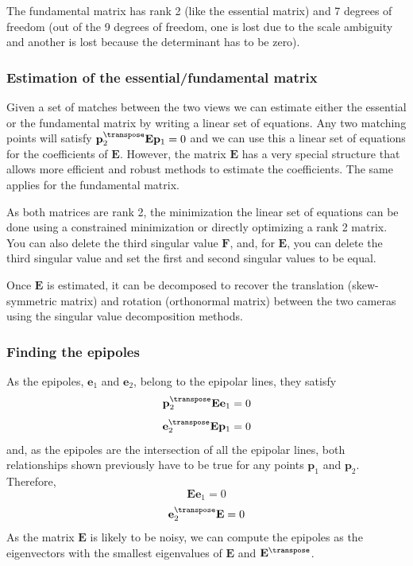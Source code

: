 The fundamental matrix has rank 2 (like the essential matrix) and 7 degrees of freedom (out of the 9 degrees of freedom, one is lost due to the scale ambiguity and another is lost because the determinant has to be zero). 

\subsubsection{Estimation of the essential/fundamental matrix}
Given a set of matches between the two views we can estimate either the essential or the fundamental matrix by writing a linear set of equations. Any two matching points will satisfy $\mathbf{p}_2^\transpose \mathbf{E} \mathbf{p}_1 = 0$ and we can use this a linear set of equations for the coefficients of $\mathbf{E}$. However, the matrix $\mathbf{E}$ has a very special structure that allows more efficient and robust methods to estimate the coefficients. The same applies for the fundamental matrix. 

As both matrices are rank 2, the minimization the linear set of equations can be done using a constrained minimization or directly optimizing a rank 2 matrix. You can also delete the third singular value $\mathbf{F}$, and, for $\mathbf{E}$, you can delete the third singular value and set the first and second singular values to be equal.

Once $\mathbf{E}$ is estimated, it can be decomposed to recover the translation (skew-symmetric matrix) and rotation (orthonormal matrix) between the two cameras using the singular value decomposition methods. 

\subsubsection{Finding the epipoles}
As the epipoles, $\mathbf{e}_1$ and $\mathbf{e}_2$, belong to the epipolar lines, they satisfy
\begin{equation}
\mathbf{p}_2^\transpose \mathbf{E} \mathbf{e}_1 = 0
\end{equation}\begin{equation}
\mathbf{e}_2^\transpose \mathbf{E} \mathbf{p}_1 = 0
\end{equation}
and, as the epipoles are the intersection of all the epipolar lines, both relationships shown previously have to be true for any points $\mathbf{p}_1$ and $\mathbf{p}_2$. Therefore, 
\begin{equation}
\mathbf{E} \mathbf{e}_1 = 0
\end{equation}\begin{equation}
\mathbf{e}_2^\transpose \mathbf{E} = 0
\end{equation}
As the matrix $\mathbf{E}$ is likely to be noisy, we can compute the epipoles as the eigenvectors with the smallest eigenvalues of $\mathbf{E}$ and $\mathbf{E}^\transpose$.


